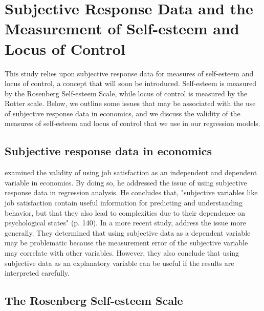 \documentclass[12pt]{report}
\newcommand{\citee}[1]{\citename{#1} \citeyear{#1}}
\begin{document}
\section*{Subjective Response Data and the Measurement of Self-esteem and Locus of Control}

This study relies upon subjective response data for measures of self-esteem and locus of control, a concept that will soon be introduced. Self-esteem is measured by the Rosenberg Self-esteem Scale, while locus of control is measured by the Rotter scale. Below, we outline some issues that may be associated with the use of subjective response data in economics, and we discuss the validity of the measures of self-esteem and locus of control that we use in our regression models.

\subsection*{Subjective response data in economics}


\begin{comment}This section will contain a discussion on the validity of using subjective response data as a dependent or independent variable. A good example of this is in Waddell (2006), p. 75.\end{comment}

\citee{F1978} examined the validity of using job satisfaction as an independent and dependent variable in economics. By doing so, he addressed the issue of using subjective response data in regression analysis. He concludes that, "subjective variables like job satisfaction contain useful information for predicting and understanding behavior, but that they also lead to complexities due to their dependence on psychological states" (p. 140). In a more recent study, \citee{BM2001} address the issue more generally. They determined that using subjective data as a dependent variable may be problematic because the measurement error of the subjective variable may correlate with other variables. However, they also conclude that using subjective data as an explanatory variable can be useful if the results are interpreted carefully.

\subsection*{The Rosenberg Self-esteem Scale}
\end{document}
